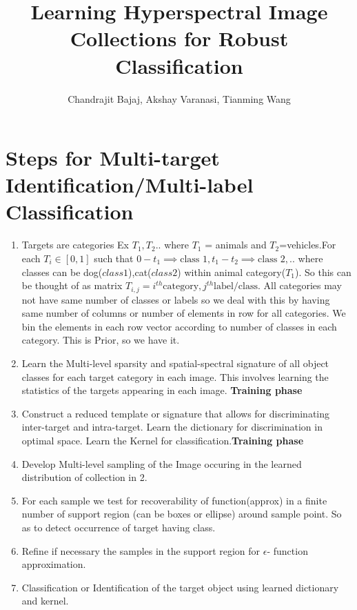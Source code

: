 \documentclass{article}
\title{Learning Hyperspectral Image Collections for Robust Classification}
\author{Chandrajit Bajaj, Akshay Varanasi, Tianming Wang}
\date{}
\begin{document}
\maketitle

\tableofcontents
\newpage

\section{Steps for Multi-target Identification/Multi-label Classification}
\begin{enumerate}
    \item Targets are categories Ex $T_1, T_2..$ where $T_1$ = animals and $T_2$=vehicles.For each $T_i \in [0,1] $ such that $0-t_1 \implies \text{class 1}, t_1-t_2 \implies \text{class 2}, .. $  where classes can be dog($class 1$),cat($class 2$) within animal category($T_1$). So this can be thought of as matrix $T_{i,j}= i^{th} \text{category},j^{th}\text{label/class}$. All categories may not have same number of classes or labels so we deal with this by having same number of columns or number of elements in row  for all categories. We bin the elements in each row vector according to number of classes in each category. This is Prior, so we have it.  
    \item Learn the Multi-level sparsity and spatial-spectral signature of all object classes for each target category in each image. This involves learning the statistics of the targets appearing in each image. \textbf{Training phase}
    \item Construct a reduced template or signature that allows for discriminating inter-target and intra-target. Learn the dictionary for discrimination in optimal space. Learn the Kernel for classification.\textbf{Training phase} 
    \item Develop Multi-level sampling of the Image occuring in the learned distribution of collection in 2.
    \item For each sample we test for recoverability of function(approx) 
    in a finite number of support region (can be boxes or ellipse) around sample point. So as to detect occurrence of target having class. 
    \item Refine if necessary the samples in the support region for $\epsilon$- function approximation.
    \item Classification or Identification of the target object using learned dictionary and kernel.
\end{enumerate}
\end{document}
